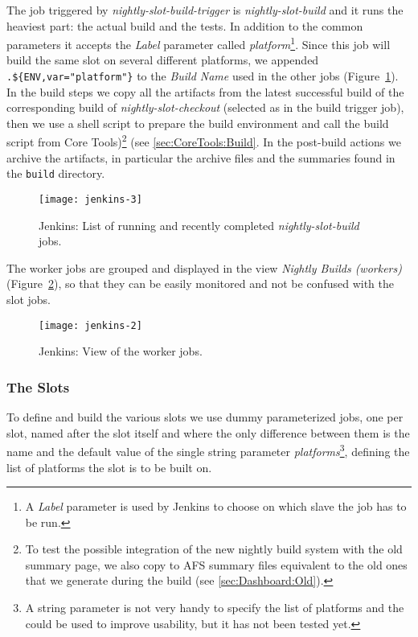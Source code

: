 The job triggered by \emph{nightly-slot-build-trigger} is
\emph{nightly-slot-build} and it runs the heaviest part: the actual build and
the tests.  In addition to the common parameters it accepts the \emph{Label}
parameter called \emph{platform}\footnote{A \emph{Label} parameter is used by
Jenkins to choose on which slave the job has to be run.}.  Since this job will
build the same slot on several different platforms, we appended
\verb|.${ENV,var="platform"}| to the \emph{Build Name} used in the other jobs
(Figure~\ref{fig:jenkins-builds}).  In the build steps we copy all the artifacts
from the latest successful build of the corresponding build of
\emph{nightly-slot-checkout} (selected as in the build trigger job), then we use
a shell script to prepare the build environment and call the build script from
Core Tools)\footnote{To test the possible integration of the new nightly build
  system with the old summary page, we also copy to AFS summary files equivalent
  to the old ones that we generate during the build (see \ref{sec:Dashboard:Old}).}
(see \ref{sec:CoreTools:Build}. In the post-build actions we archive the artifacts,
in particular the archive files and the summaries found in the \texttt{build}
directory.

\begin{figure}
  \begin{center}
    \texttt{[image: jenkins-3]}
  \end{center}
  \caption{Jenkins: List of running and recently completed
  \emph{nightly-slot-build} jobs.}
  \label{fig:jenkins-builds}
\end{figure}

The worker jobs are grouped and displayed in the view \emph{Nightly Builds
(workers)} (Figure~\ref{fig:jenkins-workers}), so that they can be easily
monitored and not be confused with the slot jobs.

\begin{figure}
  \begin{center}
    \texttt{[image: jenkins-2]}
  \end{center}
  \caption{Jenkins: View of the worker jobs.}
  \label{fig:jenkins-workers}
\end{figure}


\subsubsection{The Slots}
\label{sec:Jenkins:Slots}
To define and build the various slots we use dummy parameterized jobs, one per
slot, named after the slot itself and where the only difference between them is
the name and the default value of the single string parameter
\emph{platforms}\footnote{A string parameter is not very handy to specify the
list of platforms and the
 could be used to improve usability, but it has
not been tested yet.}, defining the list of platforms the slot is to be built
on.

